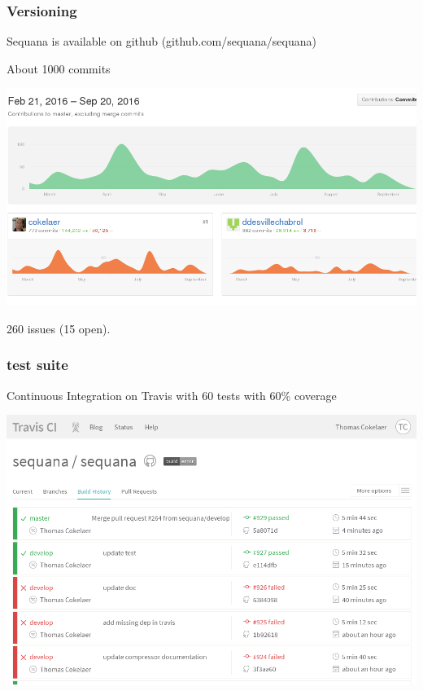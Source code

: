 \documentclass{beamer}
\begin{document}
\begin{frame}[fragile]
 \frametitle{Versioning}
Sequana is available on github (github.com/sequana/sequana)

About 1000 commits \\
\begin{center}
\includegraphics[scale=0.2]{images/commits}
\end{center}
260 issues (15 open).

\end{frame}



\begin{frame}[fragile]
    \frametitle{test suite}
    \begin{block}{}
    Continuous Integration on Travis with 60 tests with 60\% coverage
    \end{block}
    
    
        \includegraphics[scale=0.35]{images/travis}
\end{frame}
\end{document}
